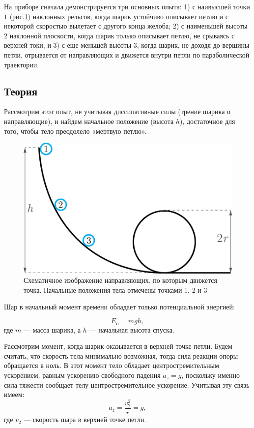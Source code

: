 \documentclass[All.tex]{subfiles}
\begin{document}
На приборе сначала демонстрируется три основных опыта: 1) с наивысшей точки $ 1 $ (рис.\ref{loop-2}) наклонных рельсов, когда шарик устойчиво описывает петлю и с некоторой скоростью вылетает с другого конца желоба; 2) с наименьшей высоты $ 2 $ наклонной плоскости, когда шарик только описывает петлю, не срываясь с верхней токи, и 3) с еще меньшей высоты $ 3 $, когда шарик, не доходя до вершины петли, отрывается от направляющих и движется внутри петли по параболической траектории.

\subsection*{\textcolor{PineGreen}{Теория}}

Рассмотрим этот опыт, не учитывая диссипативные силы (трение шарика о направляющие), и найдем начальное положение (высота $ h $), достаточное для того, чтобы тело преодолело «мертвую петлю».  

\begin{figure}[H] 
	\centering 	
	\includegraphics[width=0.5\linewidth]{loop-2.png}
	\caption{Схематичное изображение направляющих, по которым движется точка. Начальные положения тела отмечены точками 1, 2 и 3}
	\label{loop-2}
\end{figure}

Шар в начальный момент времени обладает только потенциальной энергией:
  
\begin{equation}\label{loop-eq1}
E_{\text{п}} = mgh,
\end{equation}
 где $ m $ — масса шарика, а $ h $ — начальная высота спуска.
 
Рассмотрим момент, когда шарик оказывается в верхней точке петли. Будем считать, что скорость тела минимально возможная, тогда сила реакции опоры обращается в ноль.
В этот момент тело обладает центростремительным ускорением, равным ускорению свободного падения $ a_{z} = g $, поскольку именно сила тяжести сообщает телу центростремительное ускорение.
Учитывая эту связь имеем:  
\begin{equation}\label{loop-eq5}
a_{z} = \frac{v^{2}_{2}}{r} = g,
\end{equation}
где $ v_2 $ — скорость шара в верхней точке петли.
\end{document}

